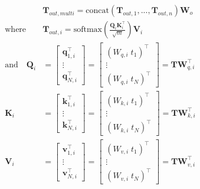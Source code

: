 			\begin{align}
				&\mathbf{T}_{out,multi}	= \mathrm{concat}(\mathbf{T}_{out,1}, ..., \mathbf{T}_{out,n}) \mathbf{W}_{o} \label{eq:multihead}\\
				\mathrm{where} \quad &\mathbf{T}_{out,i} = \mathrm{softmax} \left(\frac{\mathbf{Q}_{i}\mathbf{K}_{i}^{\top}}{\sqrt m} \right) \mathbf{V}_{i} \nonumber \\ 
				\mathrm{and} \quad 	\mathbf{Q}_{i} &= 
				\begin{bmatrix}
					\mathbf{q}_{1,i}^{\top}\\
					\vdots \\ 
					\mathbf{q}_{N,i}^{\top}
				\end{bmatrix} = 
				\begin{bmatrix}
					(W_{q,i} \; t_{1})^{\top}\\
					\vdots \\ 
					(W_{q, i} \; t_{N})^{\top}
				\end{bmatrix} = \mathbf{T} \mathbf{W}_{q,i}^{\top} \nonumber \\ 
				\mathbf{K}_{i} &= 
				\begin{bmatrix}
					\mathbf{k}_{1,i}^{\top}\\
					\vdots \\ 
					\mathbf{k}_{N,i}^{\top}
				\end{bmatrix} = 
				\begin{bmatrix}
					(W_{k,i} \; t_{1})^{\top}\\
					\vdots \\ 
					(W_{k,i} \; t_{N})^{\top}
				\end{bmatrix} = \mathbf{T} \mathbf{W}_{k,i}^{\top} \nonumber \\ 			
				\mathbf{V}_{i} &= 
				\begin{bmatrix}
					\mathbf{v}_{1, i}^{\top}\\
					\vdots \\ 
					\mathbf{v}_{N, i}^{\top}
				\end{bmatrix} = 
				\begin{bmatrix}
					(W_{v,i} \; t_{1})^{\top}\\
					\vdots \\ 
					(W_{v,i} \; t_{N})^{\top}
				\end{bmatrix} = \mathbf{T} \mathbf{W}_{v,i}^{\top} \nonumber
            \end{align}
		
